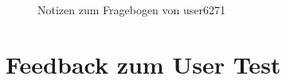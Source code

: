 \begin{figure}[!htb]
    \centering
    \caption{Notizen zum Fragebogen von user6271}
    \label{fig:feedback-user6271-back}
\end{figure}

\clearpage

\section{Feedback zum User Test}
\label{sec:anhang-feedback-user-tests}

